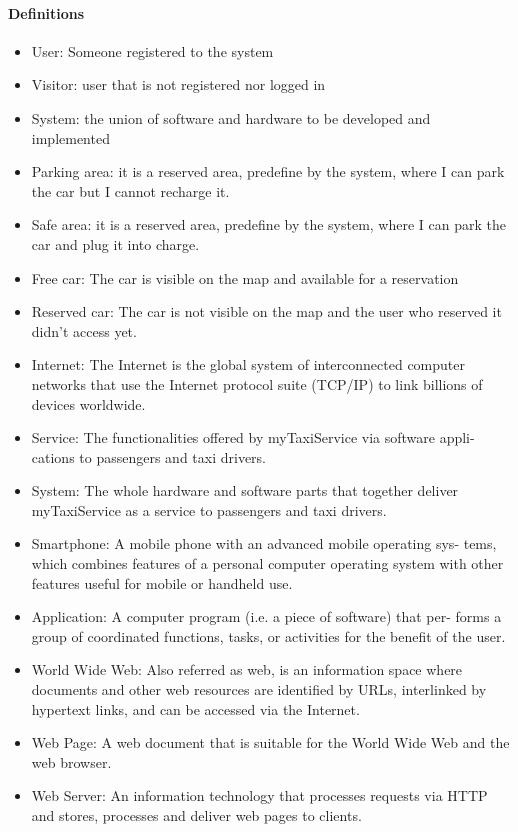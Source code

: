 \paragraph{Definitions}
\begin{itemize}
	\item User: Someone registered to the system
	\item Visitor: user that is not registered nor logged in
	\item System: the union of software and hardware to be developed and implemented
	\item Parking area: it is a reserved area, predefine by the system, where I can park the car but I cannot recharge it.
	\item Safe area: it is a reserved area, predefine by the system, where I can park the car and plug it into charge.
	\item Free car: The car is visible on the map and available for a reservation
	\item Reserved car: The car is not visible on the map and the user who reserved it didn't access yet.
	\item Internet: The Internet is the global system of interconnected computer networks that use the Internet protocol suite (TCP/IP) to link billions of devices worldwide.
	\item Service: The functionalities offered by myTaxiService via software appli- cations to passengers and taxi drivers.
	\item System: The whole hardware and software parts that together deliver myTaxiService as a service to passengers and taxi drivers.
	\item Smartphone: A mobile phone with an advanced mobile operating sys- tems, which combines features of a personal computer operating system with other features useful for mobile or handheld use.
	\item Application: A computer program (i.e. a piece of software) that per- forms a group of coordinated functions, tasks, or activities for the benefit of the user.
	\item World Wide Web: Also referred as web, is an information space where documents and other web resources are identified by URLs, interlinked by hypertext links, and can be accessed via the Internet.
	\item Web Page: A web document that is suitable for the World Wide Web and the web browser.
	\item Web Server: An information technology that processes requests via HTTP and stores, processes and deliver web pages to clients.

\end{itemize}
